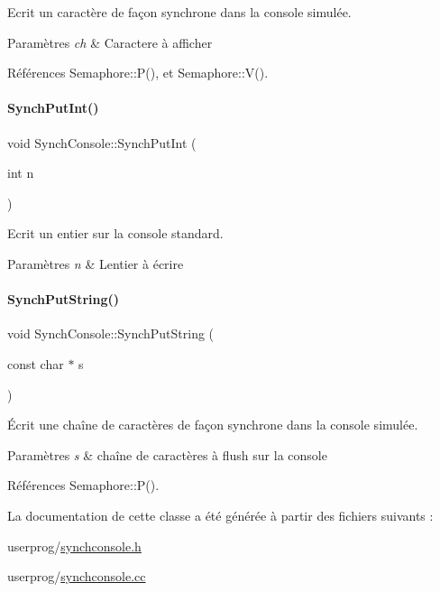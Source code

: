 Ecrit un caractère de façon synchrone dans la console simulée. 


\begin{DoxyParams}{Paramètres}
{\em ch} & Caractere à afficher \\
\hline
\end{DoxyParams}


Références Semaphore\+::\+P(), et Semaphore\+::\+V().

\hypertarget{class_synch_console_a7e65587e2fb5725e30dd46204c6ed56c}{}\label{class_synch_console_a7e65587e2fb5725e30dd46204c6ed56c} 
\paragraph{\texorpdfstring{Synch\+Put\+Int()}{SynchPutInt()}}
{\footnotesize\ttfamily void Synch\+Console\+::\+Synch\+Put\+Int (\begin{DoxyParamCaption}\item[{int}]{n }\end{DoxyParamCaption})}



Ecrit un entier sur la console standard. 


\begin{DoxyParams}{Paramètres}
{\em n} & L\textquotesingle{}entier à écrire \\
\hline
\end{DoxyParams}
\hypertarget{class_synch_console_adda30ee11ac596b035a06eb69b13407e}{}\label{class_synch_console_adda30ee11ac596b035a06eb69b13407e} 
\paragraph{\texorpdfstring{Synch\+Put\+String()}{SynchPutString()}}
{\footnotesize\ttfamily void Synch\+Console\+::\+Synch\+Put\+String (\begin{DoxyParamCaption}\item[{const char $\ast$}]{s }\end{DoxyParamCaption})}



Écrit une chaîne de caractères de façon synchrone dans la console simulée. 


\begin{DoxyParams}{Paramètres}
{\em s} & chaîne de caractères à flush sur la console \\
\hline
\end{DoxyParams}


Références Semaphore\+::\+P().



La documentation de cette classe a été générée à partir des fichiers suivants \+:\begin{DoxyCompactItemize}
\item 
userprog/\hyperlink{synchconsole_8h}{synchconsole.\+h}\item 
userprog/\hyperlink{synchconsole_8cc}{synchconsole.\+cc}\end{DoxyCompactItemize}
